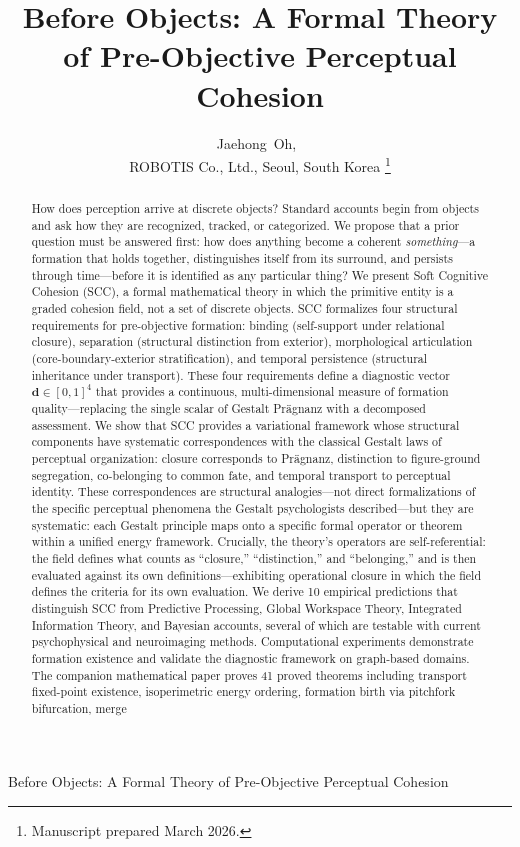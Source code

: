 \documentclass[lettersize,journal]{IEEEtran}
\begin{document}
\title{Before Objects: A Formal Theory of Pre-Objective Perceptual Cohesion}

\author{Jaehong~Oh,~\\
ROBOTIS Co., Ltd., Seoul, South Korea%
\thanks{Manuscript prepared March 2026.}%
}

%
{Before Objects: A Formal Theory of Pre-Objective Perceptual Cohesion}

\maketitle

\begin{abstract}
How does perception arrive at discrete objects? Standard accounts begin from objects and ask how they are recognized, tracked, or categorized. We propose that a prior question must be answered first: how does anything become a coherent \emph{something}---a formation that holds together, distinguishes itself from its surround, and persists through time---before it is identified as any particular thing? We present Soft Cognitive Cohesion (SCC), a formal mathematical theory in which the primitive entity is a graded cohesion field, not a set of discrete objects. SCC formalizes four structural requirements for pre-objective formation: binding (self-support under relational closure), separation (structural distinction from exterior), morphological articulation (core-boundary-exterior stratification), and temporal persistence (structural inheritance under transport). These four requirements define a diagnostic vector $\mathbf{d} \in [0,1]^4$ that provides a continuous, multi-dimensional measure of formation quality---replacing the single scalar of Gestalt Pr\"{a}gnanz with a decomposed assessment. We show that SCC provides a variational framework whose structural components have systematic correspondences with the classical Gestalt laws of perceptual organization: closure corresponds to Pr\"{a}gnanz, distinction to figure-ground segregation, co-belonging to common fate, and temporal transport to perceptual identity. These correspondences are structural analogies---not direct formalizations of the specific perceptual phenomena the Gestalt psychologists described---but they are systematic: each Gestalt principle maps onto a specific formal operator or theorem within a unified energy framework. Crucially, the theory's operators are self-referential: the field defines what counts as ``closure,'' ``distinction,'' and ``belonging,'' and is then evaluated against its own definitions---exhibiting operational closure in which the field defines the criteria for its own evaluation. We derive 10 empirical predictions that distinguish SCC from Predictive Processing, Global Workspace Theory, Integrated Information Theory, and Bayesian accounts, several of which are testable with current psychophysical and neuroimaging methods. Computational experiments demonstrate formation existence and validate the diagnostic framework on graph-based domains. The companion mathematical paper proves 41 proved theorems including transport fixed-point existence, isoperimetric energy ordering, formation birth via pitchfork bifurcation, merge 
\end{abstract}
\end{document}
